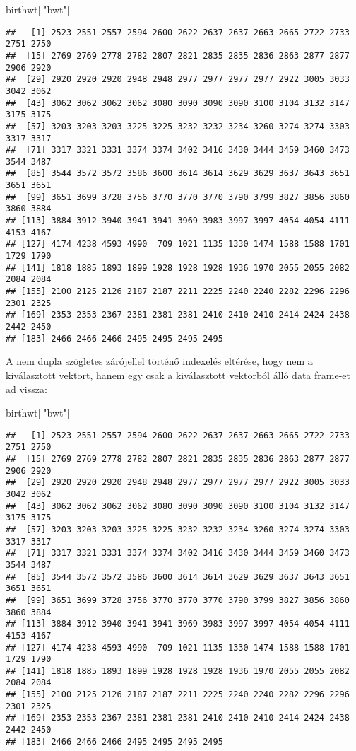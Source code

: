 \documentclass[]{book}
\newenvironment{Shaded}{\begin{snugshade}}{\end{snugshade}}
\newcommand{\StringTok}[1]{\textcolor[rgb]{0.31,0.60,0.02}{#1}}
\newcommand{\NormalTok}[1]{#1}
\begin{document}
\begin{Shaded}
\begin{Highlighting}[]
\NormalTok{birthwt[[}\StringTok{"bwt"}\NormalTok{]]}
\end{Highlighting}
\end{Shaded}

\begin{verbatim}
##   [1] 2523 2551 2557 2594 2600 2622 2637 2637 2663 2665 2722 2733 2751 2750
##  [15] 2769 2769 2778 2782 2807 2821 2835 2835 2836 2863 2877 2877 2906 2920
##  [29] 2920 2920 2920 2948 2948 2977 2977 2977 2977 2922 3005 3033 3042 3062
##  [43] 3062 3062 3062 3062 3080 3090 3090 3090 3100 3104 3132 3147 3175 3175
##  [57] 3203 3203 3203 3225 3225 3232 3232 3234 3260 3274 3274 3303 3317 3317
##  [71] 3317 3321 3331 3374 3374 3402 3416 3430 3444 3459 3460 3473 3544 3487
##  [85] 3544 3572 3572 3586 3600 3614 3614 3629 3629 3637 3643 3651 3651 3651
##  [99] 3651 3699 3728 3756 3770 3770 3770 3790 3799 3827 3856 3860 3860 3884
## [113] 3884 3912 3940 3941 3941 3969 3983 3997 3997 4054 4054 4111 4153 4167
## [127] 4174 4238 4593 4990  709 1021 1135 1330 1474 1588 1588 1701 1729 1790
## [141] 1818 1885 1893 1899 1928 1928 1928 1936 1970 2055 2055 2082 2084 2084
## [155] 2100 2125 2126 2187 2187 2211 2225 2240 2240 2282 2296 2296 2301 2325
## [169] 2353 2353 2367 2381 2381 2381 2410 2410 2410 2414 2424 2438 2442 2450
## [183] 2466 2466 2466 2495 2495 2495 2495
\end{verbatim}

A nem dupla szögletes zárójellel történő indexelés eltérése, hogy nem a
kiválasztott vektort, hanem egy csak a kiválasztott vektorból álló data
frame-et ad vissza:

\begin{Shaded}
\begin{Highlighting}[]
\NormalTok{birthwt[[}\StringTok{"bwt"}\NormalTok{]]}
\end{Highlighting}
\end{Shaded}

\begin{verbatim}
##   [1] 2523 2551 2557 2594 2600 2622 2637 2637 2663 2665 2722 2733 2751 2750
##  [15] 2769 2769 2778 2782 2807 2821 2835 2835 2836 2863 2877 2877 2906 2920
##  [29] 2920 2920 2920 2948 2948 2977 2977 2977 2977 2922 3005 3033 3042 3062
##  [43] 3062 3062 3062 3062 3080 3090 3090 3090 3100 3104 3132 3147 3175 3175
##  [57] 3203 3203 3203 3225 3225 3232 3232 3234 3260 3274 3274 3303 3317 3317
##  [71] 3317 3321 3331 3374 3374 3402 3416 3430 3444 3459 3460 3473 3544 3487
##  [85] 3544 3572 3572 3586 3600 3614 3614 3629 3629 3637 3643 3651 3651 3651
##  [99] 3651 3699 3728 3756 3770 3770 3770 3790 3799 3827 3856 3860 3860 3884
## [113] 3884 3912 3940 3941 3941 3969 3983 3997 3997 4054 4054 4111 4153 4167
## [127] 4174 4238 4593 4990  709 1021 1135 1330 1474 1588 1588 1701 1729 1790
## [141] 1818 1885 1893 1899 1928 1928 1928 1936 1970 2055 2055 2082 2084 2084
## [155] 2100 2125 2126 2187 2187 2211 2225 2240 2240 2282 2296 2296 2301 2325
## [169] 2353 2353 2367 2381 2381 2381 2410 2410 2410 2414 2424 2438 2442 2450
## [183] 2466 2466 2466 2495 2495 2495 2495
\end{verbatim}
\end{document}
